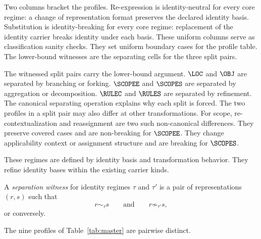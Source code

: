 Two columns bracket the profiles.
Re-expression is identity-neutral for every core regime:
a change of representation format preserves the declared identity basis.
Substitution is identity-breaking for every core regime:
replacement of the identity carrier breaks identity under each basis.
These uniform columns serve as classification sanity checks.
They set uniform boundary cases for the profile table.
The lower-bound witnesses are the separating cells for the three split pairs.

The witnessed split pairs carry the lower-bound argument.
$\LOC$ and $\OBJ$ are separated by branching or forking.
$\SCOPEE$ and $\SCOPES$ are separated by aggregation or decomposition.
$\RULEC$ and $\RULES$ are separated by refinement.
The canonical separating operation explains why each split is forced.
The two profiles in a split pair may also differ at other transformations.
For scope,
re-contextualization and reassignment are two such non-canonical differences.
They preserve covered cases and are non-breaking for $\SCOPEE$.
They change applicability context or assignment structure and are breaking for $\SCOPES$.

These regimes are defined by identity basis and transformation behavior.
They refine identity bases within the existing carrier kinds.

\begin{definition}
  \label{se200.def.SeparationWitness}
  A \emph{separation witness} for identity regimes $\tau$ and $\tau'$ is a pair of representations $(r,s)$ such that
  \[
    r \sim_\tau s
    \qquad\text{and}\qquad
    r \not\sim_{\tau'} s,
  \]
  or conversely.
\end{definition}

\begin{proposition}
  \label{se200.prop.DistinctCoreProfiles}
  The nine profiles of Table~\ref{tab:master} are pairwise distinct.
\end{proposition}

